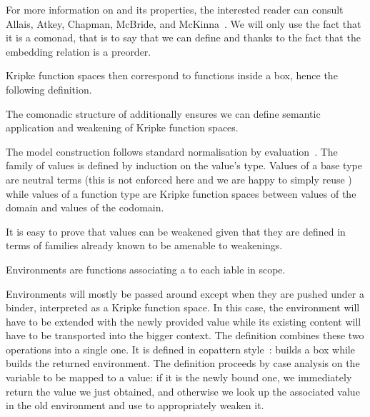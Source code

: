 \documentclass{article}
\begin{document}

For more information on  and its properties, the interested
reader can consult Allais, Atkey, Chapman, McBride, and
McKinna~\cite[Section~3.1]{DBLP:journals/jfp/AllaisACMM21}.
%
We will only use the fact that it is a comonad, that is to say that
we can define  and  thanks to
the fact that the embedding relation is a preorder.


Kripke function spaces then correspond to functions inside a box,
hence the following definition.


The comonadic structure of  additionally ensures we can define
semantic application and weakening of Kripke function spaces.


The model construction follows standard normalisation by
evaluation~\cite{DBLP:conf/lics/BergerS91,DBLP:journals/mscs/CoquandD97,DBLP:journals/lisp/Coquand02}.
The family of values is defined by induction on the value's
type.
%
Values of a base type are neutral terms (this is not enforced here and
we are happy to simply reuse ) while values of a function type
are Kripke function spaces between values of the domain and values of
the codomain.


It is easy to prove that values can be weakened given that they are
defined in terms of families already known to be amenable to weakenings.


Environments are functions associating a 
to each iable in scope.


Environments will mostly be passed around except when they are pushed
under a binder, interpreted as a Kripke function space.
%
In this case, the environment will have to be extended with the newly
provided value while its existing content will have to be transported
into the bigger context.
%
The  definition combines these two operations into a single
one. It is defined in copattern style~\cite{DBLP:conf/popl/AbelPTS13}:
{} builds a box while {} builds the
returned environment. The definition proceeds by case analysis on the
variable to be mapped to a value: if it is the newly bound one, we
immediately return the value we just obtained, and otherwise we look
up the associated value in the old environment and use  to
appropriately weaken it.
\end{document}

